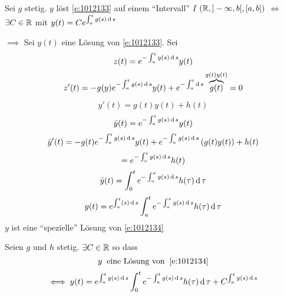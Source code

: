 \begin{theorem}
  Sei $g$ stetig. $y$ löst \ref{e:1012133} auf einem ``Intervall'' $I$ $( \mathbb{R},]-\infty,b[,[a,b])$ $\iff$ $\exists C\in\mathbb{R}$ mit $y(t)=Ce^{\int_a^tg(s)\operatorname{d} s}$
\end{theorem}
\begin{Bew}
  $\implies$ Sei $y(t)$ eine Lösung von \ref{e:1012133}. Sei
  \[z(t)=e^{-\int_a^ty(s)\operatorname{d} s}y(t)\]
  \[z'(t)=-g(y)e^{-\int_a^tg(s)\operatorname{d} s}y(t)+e^{-\int_a^t\operatorname{d} s}\overbrace{g(t)}^{g(t)y(t)}=0\]
\end{Bew}
\begin{Bsp}
  \[y'(t)=g(t)y(t)+h(t)\]
  \[\bar y(t)=e^{-\int_a^tg(s)\operatorname{d} s}y(t)\]
  \[\bar y'(t)=-g(t)e^{-\int_a^t g(s)\operatorname{d} s}y(t)+e^{-\int_a^tg(s)\operatorname{d} s}\left( g(t)y(t) \right)+h(t)\]
  \[=e^{-\int_a^tg(s)\operatorname{d} s}h(t)\]
  \[\bar y(t)=\int_0^te^{-\int_a^\tau g(s)\operatorname{d} s}h(\tau)\operatorname{d} \tau\]
  \[y(t)=e^{\int_a^t(s)\operatorname{d} s}\int_a^te^{-\int_a^\tau g(s)\operatorname{d} s}h(\tau)\operatorname{d} \tau\]
  $y$ ist eine ``spezielle'' Lösung von \ref{e:1012134}
\end{Bsp}
\begin{theorem}
  Seien $g$ und $h$ stetig. $\exists C\in\mathbb{R}$ so dass
  \[y\hspace{2mm}\text{eine Lösung von}\hspace{2mm} \ref{e:1012134}\]
  \[\iff y(t)=e^{\int_a^tg(s)\operatorname{d} s}\int_0^te^{-\int_a^t g(s)\operatorname{d} s}h(\tau)\operatorname{d} \tau+C^{\int_a^tg(s)\operatorname{d} s}\]
\end{theorem}
